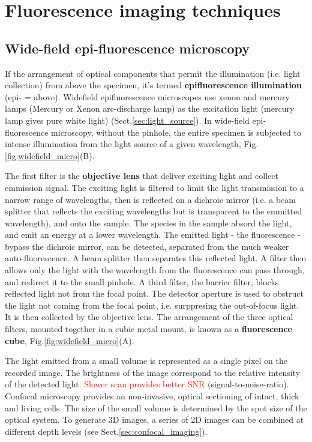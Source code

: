 \section{Fluorescence imaging techniques}

\subsection{Wide-field epi-fluorescence microscopy}
\label{sec:widefield_microscopy}

If the arrangement of optical components that permit the illumination (i.e.
light collection) from above the specimen, it's termed {\bf epifluorescence
illumination} (epi- = above). Widefield epifluorescence microscopes use xenon
and mercury lamps (Mercury or Xenon arc-discharge lamp) as the excitation light
(mercury lamp gives pure white light) (Sect.\ref{sec:light_source}). In
wide-field epi-fluorescence microscopy, without the pinhole, the entire specimen
is subjected to intense illumination from the light source of a given
wavelength, Fig.\ref{fig:widefield_micro}(B).

The first filter is the {\bf objective lens} that deliver exciting light and
collect emmission signal. The exciting light is filtered to limit the light
transmission to a narrow range of wavelengths, then is reflected on a dichroic
mirror (i.e. a beam splitter that reflects the exciting wavelengths but is
transparent to the emmitted wavelength), and onto the sample.
The species in the sample absord the light, and emit an energy at a lower
wavelength. The emitted light - the fluorescence - bypass the dichroic mirror,
can be detected, separated from the much weaker auto-fluorescence. A beam
splitter then separates this reflected light. A filter then allows only the
light with the wavelength from the fluorescence can pass through, and redirect
it to the small pinhole. A third filter, the barrier filter, blocks reflected
light not from the focal point.
The detector aperture is used to obstruct the light not coming from the focal
point, i.e. surppresing the out-of-focus light. It is then collected by the
objective lens. The arrangement of the three optical filters, mounted together
in a cubic metal mount, is known as a {\bf fluorescence cube},
Fig.\ref{fig:widefield_micro}(A).


The light emitted from a small volume is represented as a single pixel on the
recorded image. The brightness of the image correspond to the relative intensity
of the detected light. \textcolor{red}{Slower scan provides better SNR}
(signal-to-noise-ratio). Confocal microscopy provides an non-invasive, optical
sectioning of intact, thick and living cells. 
The size of the small volume is determined by the spot size of the optical
system. To generate 3D images, a series of 2D images can be combined at different depth
levels (see Sect.\ref{sec:confocal_imaging}). 

